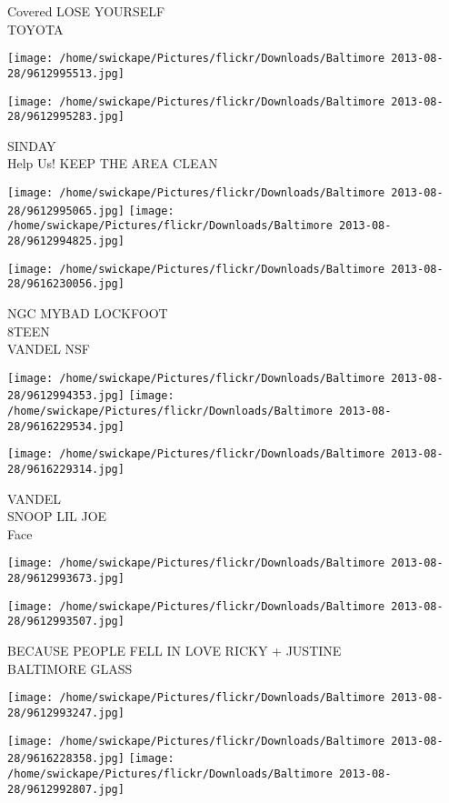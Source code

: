\documentclass[10pt,letterpaper]{article}
\begin{document}
Covered LOSE YOURSELF\\
TOYOTA
\pagebreak

\texttt{[image: /home/swickape/Pictures/flickr/Downloads/Baltimore 2013-08-28/9612995513.jpg]}

\vspace{0.25in}
\texttt{[image: /home/swickape/Pictures/flickr/Downloads/Baltimore 2013-08-28/9612995283.jpg]}

SINDAY\\
Help Us! KEEP THE AREA CLEAN
\pagebreak

\texttt{[image: /home/swickape/Pictures/flickr/Downloads/Baltimore 2013-08-28/9612995065.jpg]}
\texttt{[image: /home/swickape/Pictures/flickr/Downloads/Baltimore 2013-08-28/9612994825.jpg]}

\vspace{0.25in}
\texttt{[image: /home/swickape/Pictures/flickr/Downloads/Baltimore 2013-08-28/9616230056.jpg]}

NGC MYBAD LOCKFOOT\\
8TEEN\\
VANDEL NSF
\pagebreak

\texttt{[image: /home/swickape/Pictures/flickr/Downloads/Baltimore 2013-08-28/9612994353.jpg]}
\texttt{[image: /home/swickape/Pictures/flickr/Downloads/Baltimore 2013-08-28/9616229534.jpg]}

\vspace{0.25in}
\texttt{[image: /home/swickape/Pictures/flickr/Downloads/Baltimore 2013-08-28/9616229314.jpg]}

VANDEL\\
SNOOP LIL JOE\\
Face
\pagebreak

\texttt{[image: /home/swickape/Pictures/flickr/Downloads/Baltimore 2013-08-28/9612993673.jpg]}

\vspace{0.25in}
\texttt{[image: /home/swickape/Pictures/flickr/Downloads/Baltimore 2013-08-28/9612993507.jpg]}

BECAUSE PEOPLE FELL IN LOVE RICKY + JUSTINE\\
BALTIMORE GLASS
\pagebreak

\texttt{[image: /home/swickape/Pictures/flickr/Downloads/Baltimore 2013-08-28/9612993247.jpg]}

\vspace{0.25in}
\texttt{[image: /home/swickape/Pictures/flickr/Downloads/Baltimore 2013-08-28/9616228358.jpg]}
\texttt{[image: /home/swickape/Pictures/flickr/Downloads/Baltimore 2013-08-28/9612992807.jpg]}
\end{document}
